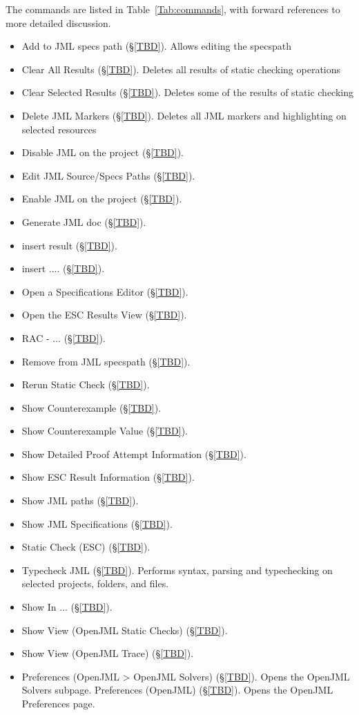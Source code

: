 The commands are listed in Table~\ref{Tab:commands}, with forward references to more detailed discussion.
\begin{itemize}
\item Add to JML specs path (\S\ref{TBD}). Allows editing the specspath 
\item Clear All Results (\S\ref{TBD}). Deletes all results of static checking operations 
\item Clear Selected Results (\S\ref{TBD}). Deletes some of the results of static checking 
\item Delete JML Markers (\S\ref{TBD}). Deletes all JML markers and highlighting on selected resources 
\item Disable JML on the project (\S\ref{TBD}). 
\item Edit JML Source/Specs Paths (\S\ref{TBD}). 
\item Enable JML on the project (\S\ref{TBD}). 
\item Generate JML doc (\S\ref{TBD}). 
\item insert \bs result (\S\ref{TBD}). 
\item insert .... (\S\ref{TBD}). 
\item Open a Specifications Editor (\S\ref{TBD}). 
\item Open the ESC Results View (\S\ref{TBD}). 
\item RAC - ... (\S\ref{TBD}). 
\item Remove from JML specspath (\S\ref{TBD}). 
\item Rerun Static Check (\S\ref{TBD}). 
\item Show Counterexample (\S\ref{TBD}). 
\item Show Counterexample Value (\S\ref{TBD}). 
\item Show Detailed Proof Attempt Information (\S\ref{TBD}). 
\item Show ESC Result Information (\S\ref{TBD}). 
\item Show JML paths (\S\ref{TBD}). 
\item Show JML Specifications (\S\ref{TBD}). 
\item Static Check (ESC) (\S\ref{TBD}). 
\item Typecheck JML (\S\ref{TBD}). Performs syntax, parsing and typechecking on selected projects, folders, and files.
\item Show In ... (\S\ref{TBD}). 
\item Show View (OpenJML Static Checks) (\S\ref{TBD}). 
\item Show View (OpenJML Trace) (\S\ref{TBD}). 
\item Preferences (OpenJML > OpenJML Solvers) (\S\ref{TBD}). Opens the OpenJML Solvers subpage.
Preferences (OpenJML) (\S\ref{TBD}). Opens the OpenJML Preferences page.
\end{itemize}




